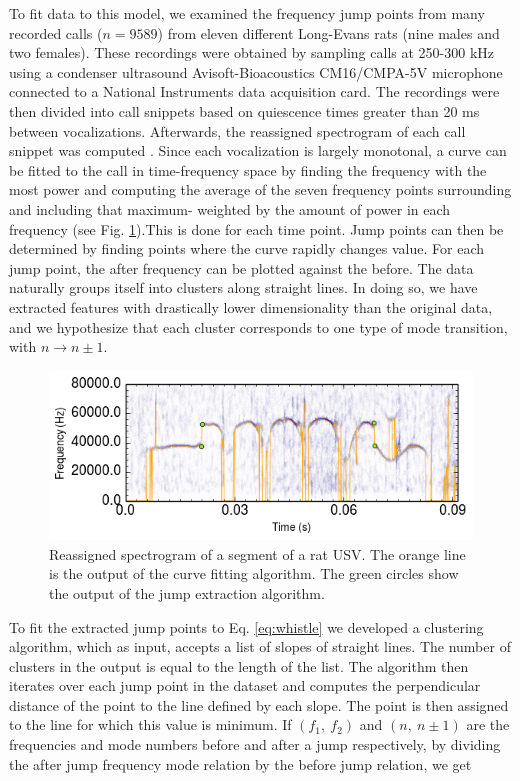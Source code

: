 \documentclass[superscriptaddress, twocolumn, prl]{revtex4}
\begin{document}
To fit data to this model, we examined the frequency jump points from many recorded calls ($n=9589$) from eleven different Long-Evans rats (nine males and two females). These recordings were obtained by sampling calls at 250-300 kHz using a condenser ultrasound Avisoft-Bioacoustics CM16/CMPA-5V microphone connected to a National Instruments data acquisition card. The recordings were then divided into call snippets based on quiescence times greater than 20 ms between vocalizations. Afterwards, the reassigned spectrogram of each call snippet was computed \cite{Gardner2006}. Since each vocalization is largely monotonal, a curve can be fitted to the call in time-frequency space by finding the frequency with the most power and computing the average of the seven frequency points surrounding and including that maximum- weighted by the amount of power in each frequency (see Fig. \ref{fig:specgram}).This is done for each time point. Jump points can then be determined by finding points where the curve rapidly changes value. For each jump point, the after frequency can be plotted against the before. The data naturally groups itself into clusters along straight lines. In doing so, we have extracted features with drastically lower dimensionality than the original data, and we hypothesize that each cluster corresponds to one type of mode transition, with $n\rightarrow n\pm1$. 
\begin{figure}[!ht]
\centering
\includegraphics[width=\columnwidth]{specgram.png}
\caption{\label{fig:specgram} Reassigned spectrogram of a segment of a rat USV. The orange line is the output of the curve fitting algorithm. The green circles show the output of the jump extraction algorithm.}
\end{figure}
To fit the extracted jump points to Eq. \ref{eq:whistle} we developed a clustering algorithm, which as input, accepts a list of slopes of straight lines. The number of clusters in the output is equal to the length of the list. The algorithm then iterates over each jump point in the dataset and computes the perpendicular distance of the point to the line defined by each slope. The point is then assigned to the line for which this value is minimum. If $\left(f_{1},\: f_{2}\right)$ and $\left(n,\: n\pm1\right)$ are the frequencies and mode numbers before and after a jump respectively, by dividing the after jump frequency mode relation by the before jump relation, we get 
\end{document}
